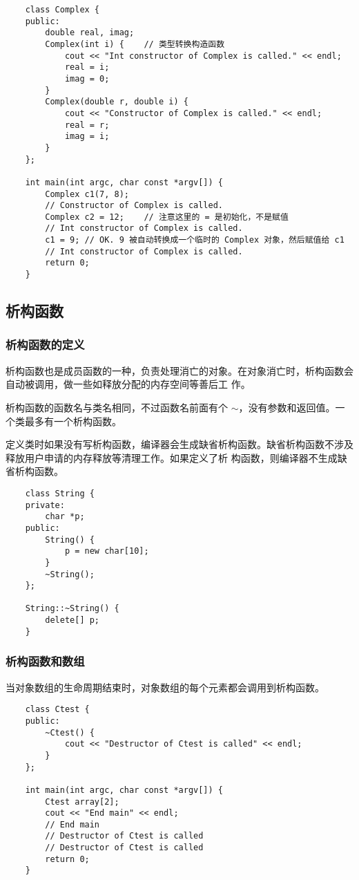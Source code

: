 \documentclass[UTF8]{ctexart}
\begin{document}
\begin{verbatim}
    class Complex {
    public:
        double real, imag;
        Complex(int i) {    // 类型转换构造函数
            cout << "Int constructor of Complex is called." << endl;
            real = i;
            imag = 0;
        }
        Complex(double r, double i) {
            cout << "Constructor of Complex is called." << endl;
            real = r;
            imag = i;
        }
    };

    int main(int argc, char const *argv[]) {
        Complex c1(7, 8);
        // Constructor of Complex is called.
        Complex c2 = 12;    // 注意这里的 = 是初始化，不是赋值
        // Int constructor of Complex is called.
        c1 = 9; // OK. 9 被自动转换成一个临时的 Complex 对象，然后赋值给 c1
        // Int constructor of Complex is called.
        return 0;
    }
\end{verbatim}

\subsection{析构函数}
\subsubsection{析构函数的定义}
析构函数也是成员函数的一种，负责处理消亡的对象。在对象消亡时，析构函数会自动被调用，做一些如释放分配的内存空间等善后工
作。

析构函数的函数名与类名相同，不过函数名前面有个 $\sim$，没有参数和返回值。一个类最多有一个析构函数。

定义类时如果没有写析构函数，编译器会生成缺省析构函数。缺省析构函数不涉及释放用户申请的内存释放等清理工作。如果定义了析
构函数，则编译器不生成缺省析构函数。

\begin{verbatim}
    class String {
    private:
        char *p;
    public:
        String() {
            p = new char[10];
        }
        ~String();
    };

    String::~String() {
        delete[] p;
    }
\end{verbatim}

\subsubsection{析构函数和数组}
当对象数组的生命周期结束时，对象数组的每个元素都会调用到析构函数。
\begin{verbatim}
    class Ctest {
    public:
        ~Ctest() {
            cout << "Destructor of Ctest is called" << endl;
        }
    };

    int main(int argc, char const *argv[]) {
        Ctest array[2];
        cout << "End main" << endl;
        // End main
        // Destructor of Ctest is called
        // Destructor of Ctest is called
        return 0;
    }
\end{verbatim}
\end{document}
